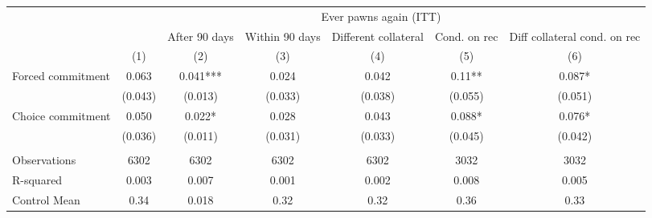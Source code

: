 \begin{tabular}{lcccccc}
\toprule
      & \multicolumn{6}{c}{Ever pawns again (ITT)} \\
\cmidrule{2-7}      &       & After 90 days & Within 90 days & Different collateral & Cond. on rec & Diff collateral cond. on rec \\
\midrule
\midrule
      & (1)   & (2)   & (3)   & (4)   & (5)   & (6) \\
\midrule
\midrule
Forced commitment & 0.063 & 0.041*** & 0.024 & 0.042 & 0.11** & 0.087* \\
      & (0.043) & (0.013) & (0.033) & (0.038) & (0.055) & (0.051) \\
Choice commitment & 0.050 & 0.022* & 0.028 & 0.043 & 0.088* & 0.076* \\
      & (0.036) & (0.011) & (0.031) & (0.033) & (0.045) & (0.042) \\
      &       &       &       &       &       &  \\
\midrule
Observations & 6302  & 6302  & 6302  & 6302  & 3032  & 3032 \\
R-squared & 0.003 & 0.007 & 0.001 & 0.002 & 0.008 & 0.005 \\
Control Mean & 0.34  & 0.018 & 0.32  & 0.32  & 0.36  & 0.33 \\
\bottomrule
\bottomrule
\end{tabular}%
